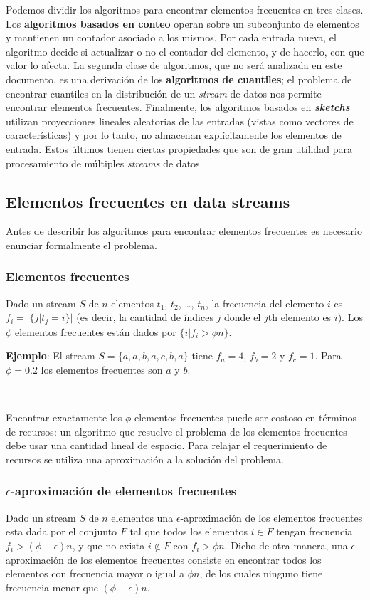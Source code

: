 \documentclass[a4paper,10pt, oneside]{article}
\begin{document}
Podemos dividir los algoritmos para encontrar elementos frecuentes en tres clases. Los \textbf{algoritmos basados en conteo} operan sobre un subconjunto de elementos y mantienen un contador asociado a los mismos. Por cada entrada nueva, el algoritmo decide si actualizar o no el contador del elemento, y de hacerlo, con que valor lo afecta. 
La segunda clase de algoritmos, que no será analizada en este documento, es una derivación de los \textbf{algoritmos de cuantiles}; el problema de encontrar cuantiles en la distribución de un \textit{stream} de datos nos permite encontrar elementos frecuentes.
Finalmente, los algoritmos basados en \textbf{\textit{sketchs}} utilizan proyecciones lineales aleatorias de las entradas\cite{Cormode:2008:FFI:1454159.1454225} (vistas como vectores de características) y por lo tanto, no almacenan explícitamente los elementos de entrada. Estos últimos tienen ciertas propiedades que son de gran utilidad para procesamiento de múltiples \textit{streams} de datos.

\subsection{Elementos frecuentes en data streams}\label{elementos_frecuentes_en_datastreams}
Antes de describir los algoritmos para encontrar elementos frecuentes es necesario enunciar formalmente el problema.

\subsubsection{Elementos frecuentes}\label{elementos_frecuentes} Dado un stream $S$ de $n$ elementos $t_1$, $t_2$, \dots, $t_n$, la frecuencia del elemento $i$ es $f_i = |\{j|t_j=i\}|$ (es decir, la cantidad de índices $j$ donde el $j$th elemento es $i$). Los $\phi$ elementos frecuentes están dados por $\{i|f_i>\phi n\}$.

\textbf{Ejemplo}: El stream $S=\{a,a,b,a,c,b,a\}$ tiene $f_a=4$, $f_b=2$ y $f_c=1$. Para $\phi=0.2$ los elementos frecuentes son $a$ y $b$.

\

Encontrar exactamente los $\phi$ elementos frecuentes puede ser costoso en términos de recursos: un algoritmo que resuelve el problema de los elementos frecuentes debe usar una cantidad lineal de espacio\cite{Cormode:2010:MFF:1731351.1731356}. Para relajar el requerimiento de recursos se utiliza una aproximación a la solución del problema.

\subsubsection{$\epsilon$-aproximación de elementos frecuentes} 
Dado un stream $S$ de $n$ elementos una $\epsilon$-aproximación de los elementos frecuentes esta dada por el conjunto $F$ tal que todos los elementos $i \in F$ tengan frecuencia $f_i > (\phi - \epsilon)n$, y que no exista $i \notin F$ con $f_i > \phi n$. Dicho de otra manera, una $\epsilon$-aproximación de los elementos frecuentes consiste en encontrar todos los elementos con frecuencia mayor o igual a $\phi n$, de los cuales ninguno tiene frecuencia menor que $(\phi - \epsilon) n$.
\end{document}
